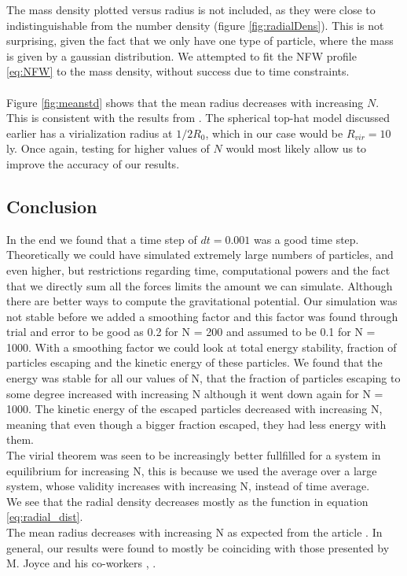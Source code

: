 \documentclass{article}
\begin{document}
The mass density plotted versus radius is not included, as they were close to indistinguishable from the number density (figure \ref{fig:radialDens}). This is not surprising, given the fact that we only have one type of particle, where the mass is given by a gaussian distribution. We attempted to fit the NFW profile \eqref{eq:NFW} to the mass density, without success due to time constraints.\\\\
Figure \ref{fig:meanstd} shows that the mean radius decreases with increasing $N$. This is consistent with the results from \cite{Joyce}. The spherical top-hat model discussed earlier has a virialization radius at $1/2 R_0$, which in our case would be $R_{vir} = 10$ ly. Once again, testing for higher values of $N$ would most likely allow us to improve the accuracy of our results.

\subsection{Conclusion}
In the end we found that a time step of $dt = 0.001$ was a good time step. 
Theoretically we could have simulated extremely large numbers of particles, and even higher, but restrictions regarding time, computational powers and the fact that we directly sum all the forces limits the amount we can simulate. Although there are better ways to compute the gravitational potential. \cite{Joyce}
Our simulation was not stable before we added a smoothing factor and this factor was found through trial and error to be good as 0.2 for N = 200  and assumed to be 0.1 for N = 1000. With a smoothing factor we could look at total energy stability, fraction of particles escaping and the kinetic energy of these particles. We found that the energy was stable for all our values of N, that the fraction of particles escaping to some degree increased with increasing N although it went down again for N = 1000. The kinetic energy of the escaped particles decreased with increasing N, meaning that even though a bigger fraction escaped, they had less energy with them. \\
The virial theorem was seen to be increasingly better fullfilled for a system in equilibrium for increasing N, this is because we used the average over a large system, whose validity increases with increasing N, instead of time average. \\
We see that the radial density decreases mostly as the function in equation \eqref{eq:radial_dist}. \\
The mean radius decreases with increasing N as expected from the article \cite{Joyce}.
In general, our results were found to mostly be coinciding with those presented by M. Joyce and his co-workers \cite{Joyce}, \cite{JoyceFull}.

\end{document}
